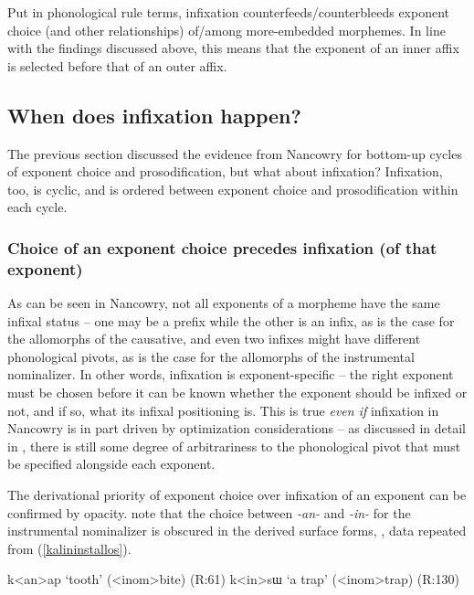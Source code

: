 \documentclass[output=paper]{langscibook}
\begin{document}
Put in phonological rule terms, infixation counterfeeds/counterbleeds exponent choice (and other relationships) of/among more-embedded morphemes. In line with the findings discussed above, this means that the exponent of an inner affix is selected before that of an outer affix.

\subsection{When does infixation happen?}\label{sec:kalin:4.2}

The previous section discussed the evidence from Nancowry for bottom-up cycles of exponent choice and prosodification, but what about infixation? Infixation, too, is cyclic, and is ordered between exponent choice and prosodification within each cycle.

\subsubsection{Choice of an exponent choice precedes infixation (of that exponent)}\label{sec:kalin:4.2.1}

As can be seen in Nancowry, not all exponents of a morpheme have the same infixal status -- one may be a prefix while the other is an infix, as is the case for the allomorphs of the causative, and even two infixes might have different phonological pivots, as is the case for the allomorphs of the instrumental nominalizer. In other words, infixation is exponent-specific -- the right exponent must be chosen before it can be known whether the exponent should be infixed or not, and if so, what its infixal positioning is. This is true {\it even if} infixation in Nancowry is in part driven by optimization considerations -- as discussed in detail in , there is still some degree of  arbitrariness to the phonological pivot that must be specified alongside each exponent.

The derivational priority of exponent choice over infixation of an exponent can be confirmed by opacity. \citet{KalinRolle21} note that the choice between \textit{-an-} and \textit{-in-} for the instrumental nominalizer is obscured in the derived surface forms, \Next, data repeated from (\ref{kalininstallos}).

\ea 
\ea k<an>ap `tooth' (<{\sc inom}>bite) \hfill (R:61)\label{kalin18a}
\ex  k<in>sɯ `a trap' (<{\sc inom}>trap) \hfill (R:130)\label{kalin18b}
\z
\z
\end{document}
